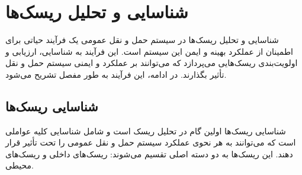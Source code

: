 \chapter{شناسایی و تحلیل ریسک‌ها}

شناسایی و تحلیل ریسک‌ها در سیستم حمل و نقل عمومی یک فرآیند حیاتی برای اطمینان از عملکرد بهینه و ایمن این سیستم است. این فرآیند به شناسایی، ارزیابی و اولویت‌بندی ریسک‌هایی می‌پردازد که می‌توانند بر عملکرد و ایمنی سیستم حمل و نقل تأثیر بگذارند. در ادامه، این فرآیند به طور مفصل تشریح می‌شود\cite{charnes1978}.

\section{شناسایی ریسک‌ها}
شناسایی ریسک‌ها اولین گام در تحلیل ریسک است و شامل شناسایی کلیه عواملی است که می‌توانند به هر نحوی عملکرد سیستم حمل و نقل عمومی را تحت تأثیر قرار دهند. این ریسک‌ها به دو دسته اصلی تقسیم می‌شوند: ریسک‌های داخلی و ریسک‌های محیطی.

